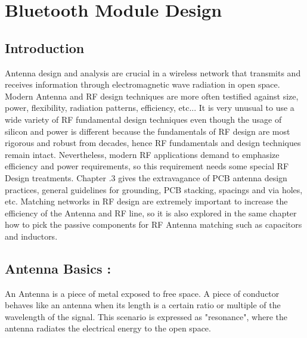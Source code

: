 
\chapter{Bluetooth Module Design}\label{chap:BLE}

\section{Introduction}


Antenna design and analysis are crucial in a wireless network that transmits and receives information through electromagnetic wave radiation in open space.
Modern Antenna and RF design techniques are more often testified against size, power, flexibility, radiation patterns, efficiency, etc...
It is very unusual to use a wide variety of RF fundamental design techniques even though the usage of silicon and power is different because the fundamentals of RF design are most rigorous and robust from decades, hence RF fundamentals and design techniques remain intact. Nevertheless, modern RF applications demand to emphasize efficiency and power requirements, so this requirement needs some special RF Design treatments.
Chapter .3 gives the extravagance of PCB antenna design practices, general guidelines for grounding, PCB stacking, spacings and via holes, etc. Matching networks in RF design are extremely important to increase the efficiency of the Antenna and RF line, so it is also explored in the same chapter how to pick the passive components for RF Antenna matching such as capacitors and inductors.

\section{Antenna Basics :}

An Antenna is a piece of metal exposed to free space. A piece of conductor behaves like an antenna when its length is a certain ratio or multiple of the wavelength of the signal. This scenario is expressed as "resonance", where the antenna radiates the electrical energy to the open space.




